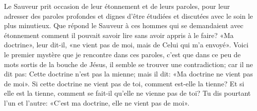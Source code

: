Le Sauveur prit occasion de leur étonnement et de leurs paroles,
	pour leur adresser des paroles profondes
	et dignes d’être étudiées et discutées avec le soin le plus minutieux.
Que répond le Sauveur à ces hommes
	qui se demandaient avec étonnement comment il pouvait savoir lire
	sans avoir appris à le faire?
«Ma doctrine», leur dit-il, «ne vient pas de moi,
	mais de Celui qui m’a envoyé».
Voici le premier mystère que je rencontre dans ces paroles,
	c’est que dans ce peu de mots sortis de la bouche de Jésus,
	il semble se trouver une contradiction;
	car il ne dit pas: Cette doctrine n’est pas la mienne;
	mais il dit: «Ma doctrine ne vient pas de moi».
Si cette doctrine ne vient pas de toi, comment est-elle la tienne?
Et si elle est la tienne, comment se fait-il qu’elle ne vienne pas de toi?
Tu dis pourtant l’un et l’autre:
	«C’est ma doctrine, elle ne vient pas de moi».
